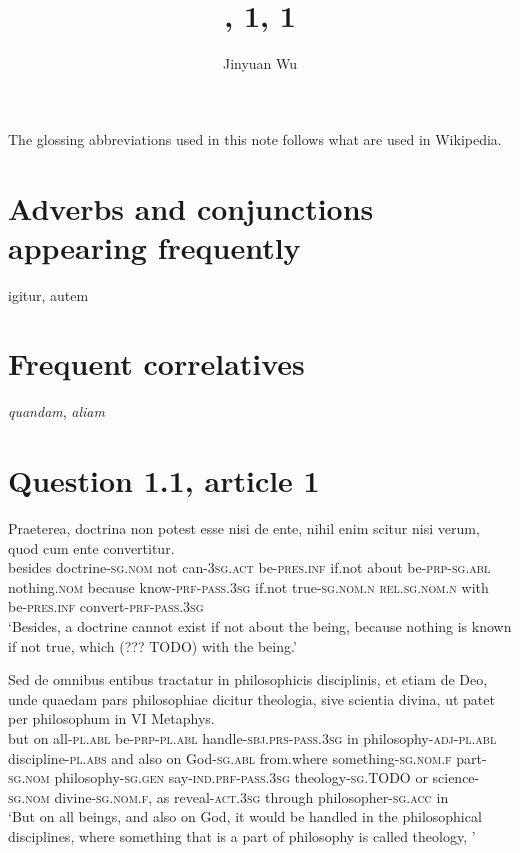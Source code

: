 \documentclass[a4paper, 12pt]{article}
\title{\form{Summa}, 1, 1}
\author{Jinyuan Wu}
\newcommand{\form}[1]{\emph{#1}}
\newcommand*{\category}[1]{\textsc{#1}}
\newcommand{\translate}[1]{`#1'}
\begin{document}
\maketitle

The glossing abbreviations used in this note 
follows what are used in Wikipedia.

\section{Adverbs and conjunctions appearing frequently}

igitur, autem

\section{Frequent correlatives}

\form{quandam}, \form{aliam}

\section{Question 1.1, article 1}

\begin{exe}
    \ex \gll Praeterea, doctrina non potest esse nisi de ente, 
    nihil enim scitur nisi verum, 
    quod cum ente convertitur. \\
    besides doctrine-\category{sg.nom} not can-\category{3sg.act} be-\category{pres.inf}
    if.not about be-\category{prp}-\category{sg.abl}
    nothing.\category{nom} because know-\category{prf}-\category{pass.3sg}
    if.not true-\category{sg.nom.n} 
    \category{rel}.\category{sg.nom.n} with be-\category{pres.inf} convert-\category{prf}-\category{pass.3sg} \\
    \translate{Besides, a doctrine cannot exist if not about the being, 
    because nothing is known if not true, 
    which (??? TODO) with the being.}
    
    \ex \gll Sed de omnibus entibus 
    tractatur in philosophicis disciplinis, 
    et etiam de Deo, 
    unde quaedam pars philosophiae dicitur theologia, 
    sive scientia divina, 
    ut patet per philosophum in VI Metaphys. \\
    but on all-\category{pl.abl} be-\category{prp}-\category{pl.abl}  
    handle-\category{sbj.prs}-\category{pass.3sg} in philosophy-\category{adj}-\category{pl.abl} discipline-\category{pl.abs} 
    and also on God-\category{sg.abl}
    from.where something-\category{sg.nom.f} part-\category{sg.nom} philosophy-\category{sg.gen} say-\category{ind.prf}-\category{pass.3sg} theology-\category{sg.TODO} 
    or science-\category{sg.nom} divine-\category{sg.nom.f},
    as reveal-\category{act.3sg} through philosopher-\category{sg.acc} in  \\
    \glt \translate{But on all beings, and also on God, 
    it would be handled in the philosophical disciplines, 
    where something that is a part of philosophy is called theology,
    }
\end{exe}
\end{document}

